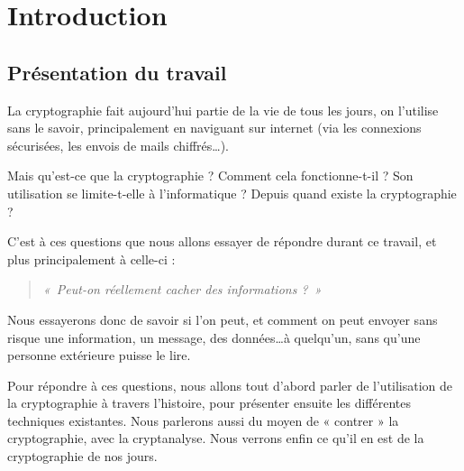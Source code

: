 \chapter{Introduction}
\thispagestyle{empty}

\section{Présentation du travail}
La cryptographie fait aujourd'hui partie de la vie de tous les jours,
on l'utilise sans le savoir, principalement en naviguant sur internet
(via les connexions sécurisées, les envois de mails chiffrés\dots).

Mais qu'est-ce que la cryptographie ? Comment cela
fonctionne-t-il ? Son utilisation se limite-t-elle à l'informatique ?
Depuis quand existe la cryptographie ?

C'est à ces questions que nous allons essayer de répondre durant ce
travail, et plus principalement à celle-ci :

\begin{quote}
\emph{«~Peut-on réellement cacher des informations ?~»}
\end{quote}

Nous essayerons donc de savoir si l'on peut, et comment on peut 
envoyer sans risque une information, un message, des données\dots à
quelqu'un, sans qu'une personne extérieure puisse le lire.

Pour répondre à ces questions, nous allons tout d'abord parler de
l'utilisation  de la cryptographie
à travers l'histoire, pour présenter ensuite les
différentes techniques existantes. Nous parlerons
aussi du moyen de « contrer » la cryptographie, avec la
cryptanalyse. Nous verrons enfin ce qu'il en est de la
cryptographie de nos jours. 


